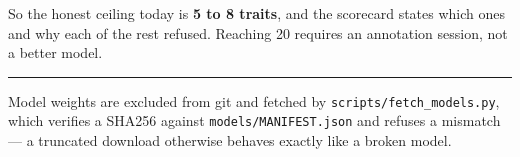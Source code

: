\documentclass[11pt,a4paper]{article}
\begin{document}
So the honest ceiling today is \textbf{5 to 8 traits}, and the scorecard states
which ones and why each of the rest refused. Reaching 20 requires an annotation
session, not a better model.

\vspace{1.4em}
\hrule
\vspace{0.7em}
{\small\color{soft}
Model weights are excluded from git and fetched by
\texttt{scripts/fetch\_models.py}, which verifies a SHA256 against
\texttt{models/MANIFEST.json} and refuses a mismatch --- a truncated download
otherwise behaves exactly like a broken model.
}
\end{document}
